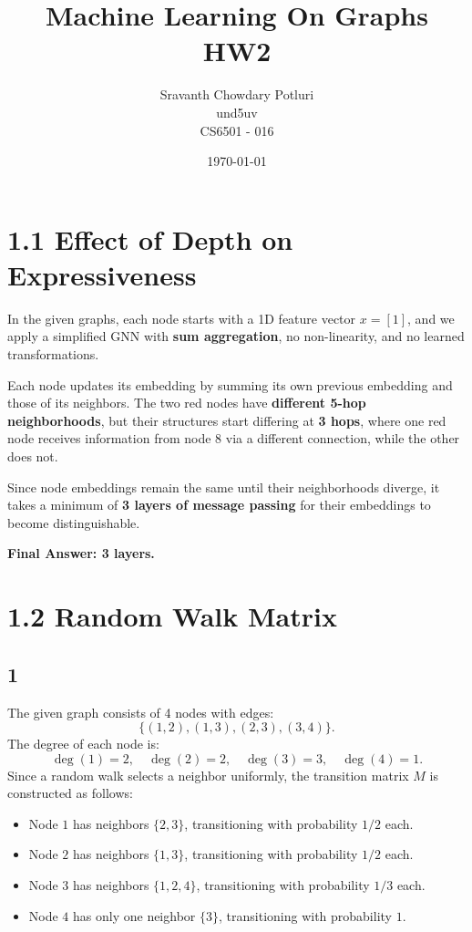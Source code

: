 \documentclass[a4paper,12pt]{article}
\title{Machine Learning On Graphs HW2}
\author{Sravanth Chowdary Potluri \\ und5uv \\ CS6501 - 016}
\date{\today}
\begin{document}
\maketitle

\section*{1.1 Effect of Depth on Expressiveness}

In the given graphs, each node starts with a 1D feature vector \( x = [1] \), and we apply a simplified GNN with \textbf{sum aggregation}, no non-linearity, and no learned transformations.

Each node updates its embedding by summing its own previous embedding and those of its neighbors. The two red nodes have \textbf{different 5-hop neighborhoods}, but their structures start differing at \textbf{3 hops}, where one red node receives information from node \(8\) via a different connection, while the other does not.

Since node embeddings remain the same until their neighborhoods diverge, it takes a minimum of \textbf{3 layers of message passing} for their embeddings to become distinguishable.

\textbf{Final Answer: 3 layers.}

\section*{1.2 Random Walk Matrix}
\subsection*{1}

The given graph consists of 4 nodes with edges:
\[
\{(1,2), (1,3), (2,3), (3,4)\}.
\]
The degree of each node is:
\[
\deg(1)=2, \quad \deg(2)=2, \quad \deg(3)=3, \quad \deg(4)=1.
\]
Since a random walk selects a neighbor uniformly, the transition matrix \(M\) is constructed as follows:

\begin{itemize}
    \item Node \(1\) has neighbors \(\{2,3\}\), transitioning with probability \(1/2\) each.
    \item Node \(2\) has neighbors \(\{1,3\}\), transitioning with probability \(1/2\) each.
    \item Node \(3\) has neighbors \(\{1,2,4\}\), transitioning with probability \(1/3\) each.
    \item Node \(4\) has only one neighbor \(\{3\}\), transitioning with probability \(1\).
\end{itemize}
\end{document}
